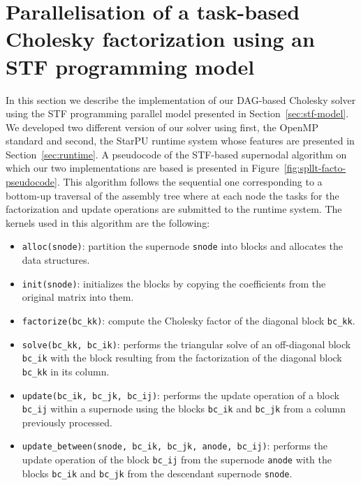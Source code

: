 \documentclass{article}
\begin{document}
\section{Parallelisation of a task-based Cholesky factorization using an STF programming model}
\label{sec:experiments}



In this section we describe the implementation of our DAG-based
Cholesky solver using the STF programming parallel model presented in
Section~\ref{sec:stf-model}. We developed two different version of our
solver using first, the OpenMP standard and second, the StarPU runtime
system whose features are presented in Section~\ref{sec:runtime}. A
pseudocode of the STF-based supernodal algorithm on which our two
implementations are based is presented in
Figure~\ref{fig:spllt-facto-pseudocode}. This algorithm follows the
sequential one corresponding to a bottom-up traversal of the assembly
tree where at each node the tasks for the factorization and update
operations are submitted to the runtime system. The kernels used in
this algorithm are the following:

\begin{itemize}
\item \texttt{alloc(snode)}: partition the supernode \texttt{snode}
  into blocks and allocates the data structures.
\item \texttt{init(snode)}: initializes the blocks by copying the
  coefficients from the original matrix into them.
\item \texttt{factorize(bc\_kk)}: compute the Cholesky factor of the
  diagonal block \texttt{bc\_kk}.
\item \texttt{solve(bc\_kk, bc\_ik)}: performs the triangular solve of
  an off-diagonal block \texttt{bc\_ik} with the block resulting from
  the factorization of the diagonal block \texttt{bc\_kk} in its
  column.
\item \texttt{update(bc\_ik, bc\_jk, bc\_ij)}: performs the update
  operation of a block \texttt{bc\_ij} within a supernode using the
  blocks \texttt{bc\_ik} and \texttt{bc\_jk} from a column previously
  processed.
\item \texttt{update\_between(snode, bc\_ik, bc\_jk, anode, bc\_ij)}:
  performs the update operation of the block \texttt{bc\_ij} from the
  supernode \texttt{anode} with the blocks \texttt{bc\_ik} and
  \texttt{bc\_jk} from the descendant supernode \texttt{snode}.
\end{itemize}
\end{document}
